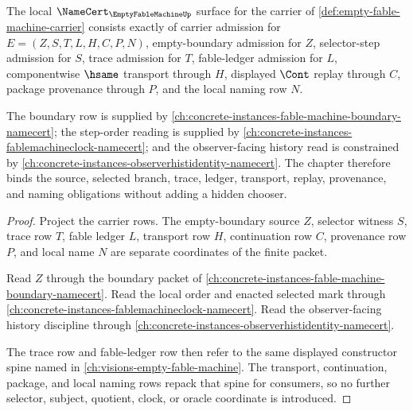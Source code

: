 \begin{theorem}
\label{thm:empty-fable-machine-namecert-obligations}
The local $\NameCert_{\EmptyFableMachineUp}$ surface for the carrier of \autoref{def:empty-fable-machine-carrier} consists exactly of carrier admission for $E=(Z,S,T,L,H,C,P,N)$, empty-boundary admission for $Z$, selector-step admission for $S$, trace admission for $T$, fable-ledger admission for $L$, componentwise $\hsame$ transport through $H$, displayed $\Cont$ replay through $C$, package provenance through $P$, and the local naming row $N$.

The boundary row is supplied by \autoref{ch:concrete-instances-fable-machine-boundary-namecert}; the step-order reading is supplied by \autoref{ch:concrete-instances-fablemachineclock-namecert}; and the observer-facing history read is constrained by \autoref{ch:concrete-instances-observerhistidentity-namecert}. The chapter therefore binds the source, selected branch, trace, ledger, transport, replay, provenance, and naming obligations without adding a hidden chooser.
\end{theorem}
\begin{proof}
Project the carrier rows. The empty-boundary source $Z$, selector witness $S$, trace row $T$, fable ledger $L$, transport row $H$, continuation row $C$, provenance row $P$, and local name $N$ are separate coordinates of the finite packet.

Read $Z$ through the boundary packet of \autoref{ch:concrete-instances-fable-machine-boundary-namecert}. Read the local order and enacted selected mark through \autoref{ch:concrete-instances-fablemachineclock-namecert}. Read the observer-facing history discipline through \autoref{ch:concrete-instances-observerhistidentity-namecert}.

The trace row and fable-ledger row then refer to the same displayed constructor spine named in \autoref{ch:visions-empty-fable-machine}. The transport, continuation, package, and local naming rows repack that spine for consumers, so no further selector, subject, quotient, clock, or oracle coordinate is introduced.
\end{proof}

